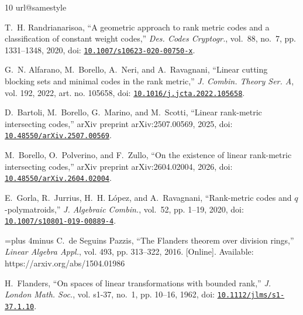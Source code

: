 \documentclass[12pt,letterpaper,onecolumn]{article}
\newcommand{\doi}[1]{\href{https://doi.org/#1}{\nolinkurl{#1}}}
\theoremstyle{definition}
\begin{document}
\begin{thebibliography}{10}
\providecommand{\url}[1]{#1}
\csname url@samestyle\endcsname
\providecommand{\newblock}{\relax}
\providecommand{\bibinfo}[2]{#2}
\providecommand{\BIBentrySTDinterwordspacing}{\spaceskip=0pt\relax}
\providecommand{\BIBentryALTinterwordstretchfactor}{4}
\providecommand{\BIBentryALTinterwordspacing}{\spaceskip=\fontdimen2\font plus
\BIBentryALTinterwordstretchfactor\fontdimen3\font minus
  \fontdimen4\font\relax}
\providecommand{\BIBforeignlanguage}[2]{{%
\expandafter\ifx\csname l@#1\endcsname\relax
\typeout{** WARNING: IEEEtran.bst: No hyphenation pattern has been}%
\typeout{** loaded for the language `#1'. Using the pattern for}%
\typeout{** the default language instead.}%
\else
\language=\csname l@#1\endcsname
\fi
#2}}
\providecommand{\BIBdecl}{\relax}
\BIBdecl


T.~H. Randrianarisoa, ``A geometric approach to rank metric codes and a
  classification of constant weight codes,'' \emph{Des. Codes Cryptogr.},
  vol.~88, no.~7, pp. 1331--1348, 2020, doi: \doi{10.1007/s10623-020-00750-x}.

G.~N. Alfarano, M.~Borello, A.~Neri, and A.~Ravagnani, ``Linear cutting
  blocking sets and minimal codes in the rank metric,'' \emph{J. Combin. Theory
  Ser. A}, vol. 192, 2022, art. no. 105658, doi:
  \doi{10.1016/j.jcta.2022.105658}.

D.~Bartoli, M.~Borello, G.~Marino, and M.~Scotti, ``Linear rank-metric
  intersecting codes,'' arXiv preprint arXiv:2507.00569, 2025, doi:
  \doi{10.48550/arXiv.2507.00569}.

M.~Borello, O.~Polverino, and F.~Zullo, ``On the existence of linear
  rank-metric intersecting codes,'' arXiv preprint arXiv:2604.02004, 2026, doi:
  \doi{10.48550/arXiv.2604.02004}.

E.~Gorla, R.~Jurrius, H.~H. L{\'o}pez, and A.~Ravagnani, ``Rank-metric codes
  and {$q$}-polymatroids,'' \emph{J. Algebraic Combin.}, vol.~52, pp. 1--19,
  2020, doi: \doi{10.1007/s10801-019-00889-4}.

\BIBentryALTinterwordspacing
C.~{de Seguins Pazzis}, ``The {Flanders} theorem over division rings,''
  \emph{Linear Algebra Appl.}, vol. 493, pp. 313--322, 2016. [Online].
  Available: \url{https://arxiv.org/abs/1504.01986}
\BIBentrySTDinterwordspacing

H.~Flanders, ``On spaces of linear transformations with bounded rank,''
  \emph{J. London Math. Soc.}, vol. s1-37, no.~1, pp. 10--16, 1962, doi:
  \doi{10.1112/jlms/s1-37.1.10}.
\end{thebibliography}
\end{document}
